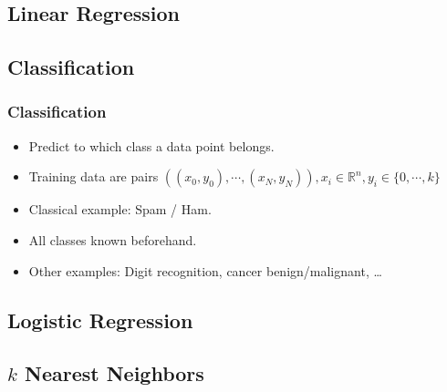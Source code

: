 \documentclass[english,final,compress]{beamer}
\begin{document}
\subsection{Linear Regression}



\subsection{Classification}
\begin{frame}
    \frametitle{Classification}
    \begin{itemize}
        \item Predict to which class a data point belongs.
        \item Training data are pairs $\left( (x_0, y_0), \cdots, (x_N, y_N)
                \right), x_i \in \mathbb{R}^n, y_i \in \{0, \cdots, k\}$
        \item Classical example: Spam / Ham.
        \item All classes known beforehand.
        \item Other examples: Digit recognition, cancer benign/malignant, \ldots
    \end{itemize}
\end{frame}

\subsection{Logistic Regression}



\subsection{$k$ Nearest Neighbors}


\end{document}
